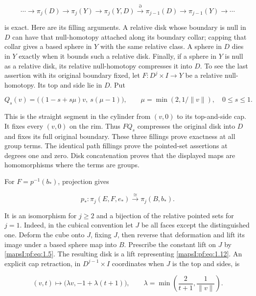 \documentclass[11pt]{article}
\begin{document}
\begin{equation}
\cdots\to\pi_j(D)\to\pi_j(Y)\to\pi_j(Y,D)
\xrightarrow{\partial}\pi_{j-1}(D)\to\pi_{j-1}(Y)\to\cdots
\label{mapsI:pf:eq:1.10}
\end{equation}

is exact. Here are its filling arguments. A relative disk whose boundary is null in \(D\) can have that null-homotopy attached along its boundary collar; capping that collar gives a based sphere in \(Y\) with the same relative class. A sphere in \(D\) dies in \(Y\) exactly when it bounds such a relative disk. Finally, if a sphere in \(Y\) is null as a relative disk, its relative null-homotopy compresses it into \(D\). To see the last assertion with its original boundary fixed, let \(F:D^j\times I\to Y\) be a relative null-homotopy. Its top and side lie in \(D\). Put

\begin{equation}
Q_s(v)=\bigl((1-s+s\mu)v,\ s(\mu-1)\bigr),
\qquad \mu=\min(2,1/\|v\|),\quad0\leq s\leq1.
\label{mapsI:pf:eq:1.11}
\end{equation}

This is the straight segment in the cylinder from \((v,0)\) to its top-and-side cap. It fixes every \((v,0)\) on the rim. Thus \(FQ_s\) compresses the original disk into \(D\) and fixes its full original boundary. These three fillings prove exactness at all group terms. The identical path fillings prove the pointed-set assertions at degrees one and zero. Disk concatenation proves that the displayed maps are homomorphisms where the terms are groups.

For \(F=p^{-1}(b_*)\), projection gives

\begin{equation}
p_*:\pi_j(E,F,e_*)\xrightarrow{\ \cong\ }\pi_j(B,b_*).
\label{mapsI:pf:eq:1.12}
\end{equation}

It is an isomorphism for \(j\geq2\) and a bijection of the relative pointed sets for \(j=1\). Indeed, in the cubical convention let \(J\) be all faces except the distinguished one. Deform the cube onto \(J\), fixing \(J\), then reverse that deformation and lift its image under a based sphere map into \(B\). Prescribe the constant lift on \(J\) by \eqref{mapsI:pf:eq:1.5}. The resulting disk is a lift representing \eqref{mapsI:pf:eq:1.12}. An explicit cap retraction, in \(D^{j-1}\times I\) coordinates when \(J\) is the top and sides, is

\begin{equation}
(v,t)\longmapsto\bigl(\lambda v,-1+\lambda(t+1)\bigr),
\qquad
\lambda=\min\left(\frac2{t+1},\frac1{\|v\|}\right).
\label{mapsI:pf:eq:1.13}
\end{equation}
\end{document}
